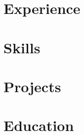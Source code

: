 \documentclass[letter,10pt]{article}
\begin{document}


\section{Experience}




\section{Skills}


\section{Projects}


\section{Education}

\end{document}
